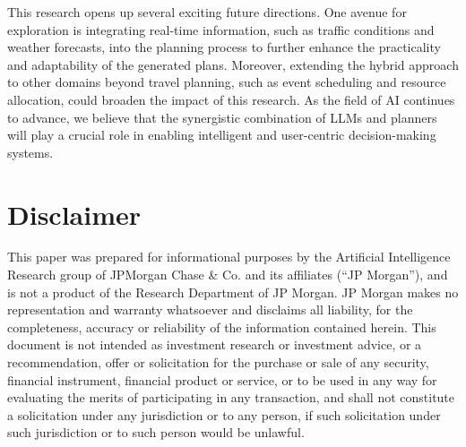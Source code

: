 \documentclass[letterpaper]{article}
\begin{document}
This research opens up several exciting future directions. One avenue for exploration is integrating real-time information, such as traffic conditions and weather forecasts, into the planning process to further enhance the practicality and adaptability of the generated plans. Moreover, extending the hybrid approach to other domains beyond travel planning, such as event scheduling and resource allocation, could broaden the impact of this research. As the field of AI continues to advance, we believe that the synergistic combination of LLMs and planners will play a crucial role in enabling intelligent and user-centric decision-making systems.


\section{Disclaimer}
This paper was prepared for informational purposes by
the Artificial Intelligence Research group of JPMorgan Chase \& Co. and its affiliates (``JP Morgan''),
and is not a product of the Research Department of JP Morgan.
JP Morgan makes no representation and warranty whatsoever and disclaims all liability,
for the completeness, accuracy or reliability of the information contained herein.
This document is not intended as investment research or investment advice, or a recommendation,
offer or solicitation for the purchase or sale of any security, financial instrument, financial product or service,
or to be used in any way for evaluating the merits of participating in any transaction,
and shall not constitute a solicitation under any jurisdiction or to any person,
if such solicitation under such jurisdiction or to such person would be unlawful.

%

\end{document}
